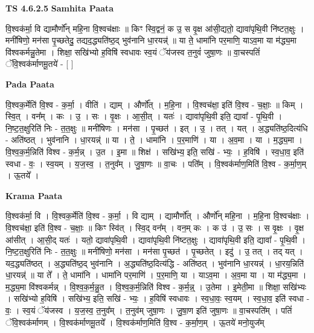 \documentclass[17pt]{extarticle}
\begin{document}
\textbf{TS 4.6.2.5 } \newline
\textbf{Samhita Paata} \newline

वि॒श्वक॑र्मा॒ वि द्यामौर्णो᳚न् महि॒ना वि॒श्वच॑क्षाः ॥ किꣳ स्वि॒द्वनं॒ क उ॒ स वृ॒क्ष आ॑सी॒द्यतो॒ द्यावा॑पृथि॒वी नि॑ष्टत॒क्षुः । मनी॑षिणो॒ मन॑सा पृ॒च्छतेदु॒ तद्यद॒द्ध्यति॑ष्ठ॒द् भुव॑नानि धा॒रयन्न्॑ ॥ या ते॒ धामा॑नि पर॒माणि॒ याऽव॒मा या म॑द्ध्य॒मा वि॑श्वकर्मन्नु॒तेमा । शिक्षा॒ सखि॑भ्यो ह॒विषि॑ स्वधावः स्व॒यं ॅय॑जस्व त॒नुवं॑ जुषा॒णः ॥ वा॒चस्पतिं॑ ॅवि॒श्वक॑र्माणमू॒तये॑ - [  ] \newline

\textbf{Pada Paata} \newline

वि॒श्वक॒र्मेति॑ वि॒श्व - क॒र्मा॒ । वीति॑ । द्याम् । और्णो᳚त् । म॒हि॒ना । वि॒श्वच॑क्षा॒ इति॑ वि॒श्व - च॒क्षाः॒ ॥ किम् । स्वि॒त् । वन᳚म् । कः । उ॒ । सः । वृ॒क्षः । आ॒सी॒त् । यतः॑ । द्यावा॑पृथि॒वी इति॒ द्यावा᳚ - पृ॒थि॒वी । नि॒ष्ट॒त॒क्षुरिति॑ निः - त॒त॒क्षुः ॥ मनी॑षिणः । मन॑सा । पृ॒च्छत॑ । इत् । उ॒ । तत् । यत् । अ॒द्ध्यति॑ष्ठ॒दित्य॑धि - अति॑ष्ठत् । भुव॑नानि । धा॒रयन्न्॑ ॥ या । ते॒ । धामा॑नि । प॒र॒माणि॑ । या । अ॒व॒मा । या । म॒द्ध्य॒मा । वि॒श्व॒क॒र्म॒न्निति॑ विश्व - क॒र्म॒न्न् । उ॒त । इ॒मा ॥ शिक्ष॑ । सखि॑भ्य॒ इति॒ सखि॑ - भ्यः॒ । ह॒विषि॑ । स्व॒धा॒व॒ इति॑ स्वधा - वः॒ । स्व॒यम् । य॒ज॒स्व॒ । त॒नुव᳚म् । जु॒षा॒णः ॥ वा॒चः । पति᳚म् । वि॒श्वक॑र्माण॒मिति॑ वि॒श्व - क॒र्मा॒ण॒म् । ऊ॒तये᳚ ।  \newline


\textbf{Krama Paata} \newline

वि॒श्वक॑र्मा॒ वि । वि॒श्वक॒र्मेति॑ वि॒श्व - क॒र्मा॒ । वि द्याम् । द्यामौर्णो᳚त् । और्णो᳚न् महि॒ना । म॒हि॒ना वि॒श्वच॑क्षाः । वि॒श्वच॑क्षा॒ इति॑ वि॒श्व - च॒क्षाः॒ ॥ किꣳ स्वि॑त् । स्वि॒द् वन᳚म् । वन॒म् कः । क उ॑ । उ॒ सः । स वृ॒क्षः । वृ॒क्ष आ॑सीत् । आ॒सी॒द् यतः॑ । यतो॒ द्यावा॑पृथि॒वी । द्यावा॑पृथि॒वी नि॑ष्टत॒क्षुः । द्यावा॑पृथि॒वी इति॒ द्यावा᳚ - पृ॒थि॒वी । नि॒ष्ट॒त॒क्षुरिति॑ निः - त॒त॒क्षुः ॥ मनी॑षिणो॒ मन॑सा । मन॑सा पृ॒च्छत॑ । पृ॒च्छतेत् । इदु॑ । उ॒ तत् । तद् यत् । यद॒द्ध्यति॑ष्ठत् । अ॒द्ध्यति॑ष्ठ॒द् भुव॑नानि । अ॒द्ध्यति॑ष्ठ॒दित्य॑द्धि - अति॑ष्ठत् । भुव॑नानि धा॒रयन्न्॑ । धा॒रय॒न्निति॑ धा॒रयन्न्॑ ॥ या ते᳚ । ते॒ धामा॑नि । धामा॑नि पर॒माणि॑ । प॒र॒माणि॒ या । याऽव॒मा । अ॒व॒मा या । या म॑द्ध्य॒मा । म॒द्ध्य॒मा वि॑श्वकर्मन्न् । वि॒श्व॒क॒र्म॒न्नु॒त । वि॒श्व॒क॒र्म॒न्निति॑ विश्व - क॒र्म॒न्न्॒ । उ॒तेमा । इ॒मेती॒मा ॥ शिक्षा॒ सखि॑भ्यः । सखि॑भ्यो ह॒विषि॑ । सखि॑भ्य॒ इति॒ सखि॑ - भ्यः॒ । ह॒विषि॑ स्वधावः । स्व॒धा॒वः॒ स्व॒यम् । स्व॒धा॒व॒ इति॑ स्वधा - वः॒ । स्व॒यं ॅय॑जस्व । य॒ज॒स्व॒ त॒नुव᳚म् । त॒नुव॑म् जुषा॒णः । जु॒षा॒ण इति॑ जुषा॒णः ॥ वा॒चस्पति᳚म् । पतिं॑ ॅवि॒श्वक॑र्माणम् । वि॒श्वक॑र्माणमू॒तये᳚ । वि॒श्वक॑र्माण॒मिति॑ वि॒श्व - क॒र्मा॒ण॒म् । ऊ॒तये॑ मनो॒युज᳚म् \newline
\end{document}
